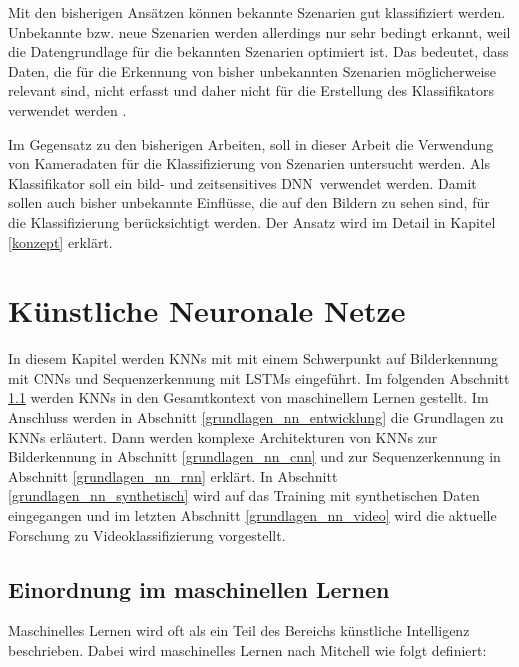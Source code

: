  Mit den bisherigen Ansätzen können bekannte Szenarien gut klassifiziert werden. Unbekannte bzw. neue Szenarien werden allerdings nur sehr bedingt erkannt, weil die Datengrundlage für die bekannten Szenarien optimiert ist. Das bedeutet, dass Daten, die für die Erkennung von bisher unbekannten Szenarien möglicherweise relevant sind, nicht erfasst und daher nicht für die Erstellung des Klassifikators verwendet werden . 

Im Gegensatz zu den bisherigen Arbeiten, soll in dieser Arbeit die Verwendung von Kameradaten für die Klassifizierung von Szenarien untersucht werden. Als Klassifikator soll ein bild- und zeitsensitives \ac{DNN} verwendet werden. Damit sollen auch bisher unbekannte Einflüsse, die auf den Bildern zu sehen sind, für die Klassifizierung berücksichtigt werden. Der Ansatz wird im Detail in Kapitel \ref{konzept} erklärt.

\section{Künstliche Neuronale Netze}
\label{grundlagen_nn}

In diesem Kapitel werden \acp{KNN} mit mit einem Schwerpunkt auf Bilderkennung mit \acp{CNN} und Sequenzerkennung mit \acp{LSTM} eingeführt. Im folgenden Abschnitt \ref{grundlagen_nn_ml} werden \acp{KNN} in den Gesamtkontext von maschinellem Lernen gestellt. Im Anschluss werden in Abschnitt \ref{grundlagen_nn_entwicklung} die Grundlagen zu \acp{KNN} erläutert. Dann werden komplexe Architekturen von \acp{KNN} zur Bilderkennung in Abschnitt \ref{grundlagen_nn_cnn} und zur Sequenzerkennung in Abschnitt \ref{grundlagen_nn_rnn} erklärt. In Abschnitt \ref{grundlagen_nn_synthetisch} wird auf das Training mit synthetischen Daten eingegangen und im letzten Abschnitt \ref{grundlagen_nn_video} wird die aktuelle Forschung zu Videoklassifizierung vorgestellt.

\subsection{Einordnung im maschinellen Lernen}
\label{grundlagen_nn_ml}

Maschinelles Lernen wird oft als ein Teil des Bereichs künstliche Intelligenz beschrieben. Dabei wird maschinelles Lernen nach Mitchell \cite{mitchell1997machine} wie folgt definiert:

